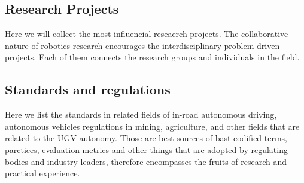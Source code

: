 \documentclass[runningheads]{llncs}
\begin{document}





\subsection{Research Projects}

Here we will collect the most influencial reseaerch projects. The collaborative nature of robotics research encourages the interdisciplinary problem-driven projects. Each of them connects the research groups and individuals in the field.








\subsection{ Standards and regulations }

Here we list the standards in related fields of in-road autonomous driving,
autonomous vehicles regulations in mining, agriculture, and other fields that are related to the UGV autonomy.
Those are best sources of bast codified terms, parctices, evaluation metrics
and other things that are adopted by regulating bodies and industry leaders, therefore encompasses the fruits of research and practical experience.
\end{document}
